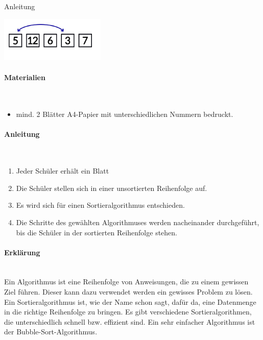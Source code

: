 \documentclass[a4paper, 12pt]{report}
\begin{document}
	\thispagestyle{empty}
	
	{
		\centering
		\Huge
		\color{blue}
		Anleitung
	}
	
	\centering
	\includegraphics[width=5cm]{IMG_1125.JPG}
	\raggedright
	\paragraph{\color{blue}Materialien} \mbox{} \\
	\begin{itemize}
		\item mind. 2 Blätter A4-Papier mit unterschiedlichen Nummern bedruckt.
	\end{itemize}
	
	\raggedright
	\paragraph{\color{blue}Anleitung} \mbox{} \\
	\begin{enumerate}
		\item Jeder Schüler erhält ein Blatt
		\item Die Schüler stellen sich in einer unsortierten Reihenfolge auf.
		\item Es wird sich für einen Sortieralgorithmus entschieden.
		\item Die Schritte des gewählten Algorithmuses werden nacheinander durchgeführt, bis die Schüler in der sortierten Reihenfolge stehen.
	\end{enumerate}
	
	\raggedright
	\paragraph{\color{blue}Erklärung} \mbox{} \\
	
	Ein Algorithmus ist eine Reihenfolge von Anweisungen, die zu einem gewissen Ziel führen.
	Dieser kann dazu verwendet werden ein gewisses Problem zu lösen.
	Ein Sortieralgorithmus ist, wie der Name schon sagt, dafür da, eine Datenmenge in die richtige Reihenfolge zu bringen.
	Es gibt verschiedene Sortieralgorithmen, die unterschiedlich schnell bzw. effizient sind. Ein sehr einfacher Algorithmus ist der Bubble-Sort-Algorithmus. 	
\end{document}
